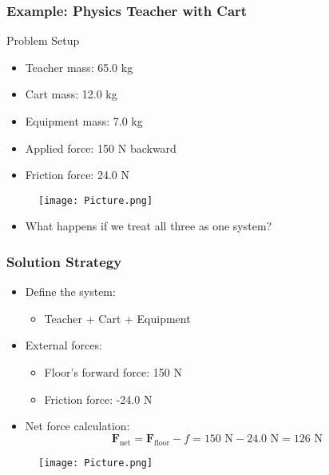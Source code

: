 \documentclass{beamer}
\begin{document}
\begin{frame}
\frametitle{Example: Physics Teacher with Cart}
\begin{block}{Problem Setup}
\begin{itemize}
    \item Teacher mass: 65.0 kg
    \item Cart mass: 12.0 kg
    \item Equipment mass: 7.0 kg
    \pause
    \item Applied force: 150 N backward
    \item Friction force: 24.0 N
\end{itemize}
\end{block}
\pause
\begin{figure}[H]
    \centering
    \texttt{[image: Picture.png]}
\end{figure}
\pause
\begin{itemize}
    \item What happens if we treat all three as one system?
\end{itemize}
\end{frame}

\begin{frame}
\frametitle{Solution Strategy}
\begin{itemize}
    \item Define the system:
    \pause
    \begin{itemize}
        \item Teacher + Cart + Equipment
    \end{itemize}
    \pause
    \item External forces:
    \pause
    \begin{itemize}
        \item Floor's forward force: 150 N
        \item Friction force: -24.0 N
    \end{itemize}
    \pause
    \item Net force calculation:
    \pause
    \[\mathbf{F}_{\text{net}} = \mathbf{F}_{\text{floor}} - f = 150\text{ N} - 24.0\text{ N} = 126\text{ N}\]
\end{itemize}
\begin{figure}
    \centering
    \texttt{[image: Picture.png]}
\end{figure}
\end{frame}
\end{document}

